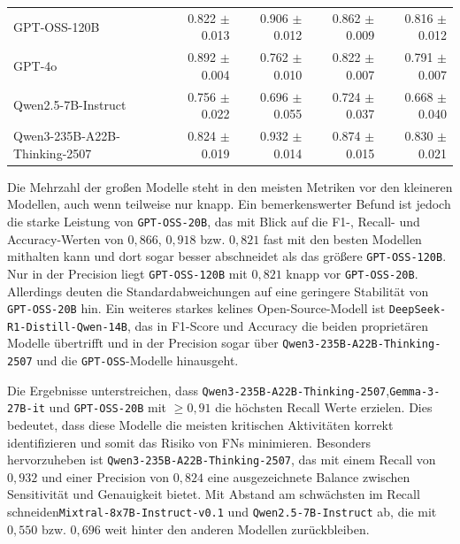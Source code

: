 \begin{table}[htbp]
\begin{adjustbox}{width=\textwidth}
\begin{tabular}{l r r r r}
            GPT-OSS-120B                    & 0.822 $\pm$ 0.013 & 0.906 $\pm$ 0.012 & 0.862 $\pm$ 0.009 & 0.816 $\pm$ 0.012 \\
            GPT-4o                          & 0.892 $\pm$ 0.004 & 0.762 $\pm$ 0.010 & 0.822 $\pm$ 0.007 & 0.791 $\pm$ 0.007 \\
            Qwen2.5-7B-Instruct             & 0.756 $\pm$ 0.022 & 0.696 $\pm$ 0.055 & 0.724 $\pm$ 0.037 & 0.668 $\pm$ 0.040 \\
            Qwen3-235B-A22B-Thinking-2507   & 0.824 $\pm$ 0.019 & 0.932 $\pm$ 0.014 & 0.874 $\pm$ 0.015 & 0.830 $\pm$ 0.021 \\
            \bottomrule
        \end{tabular}
    \end{adjustbox}
\end{table}

Die Mehrzahl der großen Modelle steht in den meisten Metriken vor den kleineren Modellen, auch wenn teilweise nur knapp. Ein bemerkenswerter Befund ist jedoch die starke Leistung von \texttt{GPT-OSS-20B}, das mit Blick auf die F1-, Recall- und Accuracy-Werten von $0{,}866$, $0{,}918$ bzw. $0{,}821$ fast mit den besten Modellen mithalten kann und dort sogar besser abschneidet als das größere \texttt{GPT-OSS-120B}. Nur in der Precision liegt \texttt{GPT-OSS-120B} mit $0{,}821$ knapp vor \texttt{GPT-OSS-20B}. Allerdings deuten die Standardabweichungen auf eine geringere Stabilität von \texttt{GPT-OSS-20B} hin. Ein weiteres starkes kelines Open-Source-Modell ist \texttt{DeepSeek-R1-Distill-Qwen-14B}, das in F1-Score und Accuracy die
beiden proprietären Modelle übertrifft und in der Precision sogar über \texttt{Qwen3-235B-A22B-Thinking-2507} und die \texttt{GPT-OSS}-Modelle hinausgeht.

Die Ergebnisse unterstreichen, dass \texttt{Qwen3-235B-A22B-Thinking-2507},\linebreak\texttt{Gemma-3-27B-it} und \texttt{GPT-OSS-20B} mit $\geq 0{,}91$ die höchsten Recall Werte erzielen. Dies bedeutet, dass diese Modelle die meisten kritischen Aktivitäten korrekt identifizieren und somit das Risiko von \acp{FN} minimieren. Besonders hervorzuheben ist \texttt{Qwen3-235B-A22B-Thinking-2507}, das mit einem Recall von $0{,}932$ und einer Precision von $0{,}824$ eine ausgezeichnete Balance zwischen Sensitivität und Genauigkeit bietet. Mit Abstand am schwächsten im Recall schneiden\linebreak\texttt{Mixtral-8x7B-Instruct-v0.1} und \texttt{Qwen2.5-7B-Instruct} ab, die mit $0{,}550$ bzw. $0{,}696$ weit hinter den anderen Modellen zurückbleiben.

